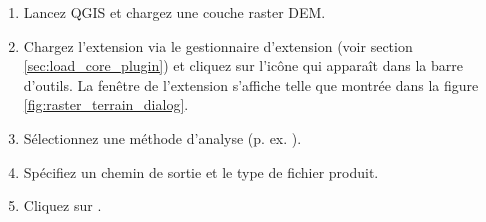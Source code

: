 \begin{enumerate}
  \item Lancez QGIS et chargez une couche raster DEM.
  \item Chargez l'extension via le gestionnaire d'extension (voir section \ref{sec:load_core_plugin}) et cliquez sur l'icône  qui apparaît dans la barre d'outils. La fenêtre de l'extension s'affiche telle que montrée dans la figure \ref{fig:raster_terrain_dialog}.
  \item Sélectionnez une méthode d'analyse (p. ex. ).
  \item Spécifiez un chemin de sortie et le type de fichier produit.
  \item Cliquez sur .
\end{enumerate}

\newpage
